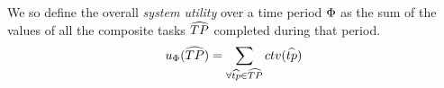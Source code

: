 We so define the overall \textit{system utility} over a time period $\Phi$ as the sum of the values of all the composite tasks $\setCompositeTask{}{}$ completed during that period.
	\begin{equation}
		\functionSystemUtility{}{} = \sum_{\forall \varCompositeTask{}{} \in \setCompositeTask{}{}}
		\functionCompositeTaskValue{}{}
	\end{equation}